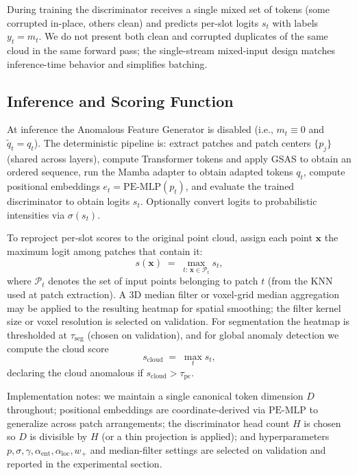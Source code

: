 During training the discriminator receives a single mixed set of tokens (some corrupted in-place, others clean) and predicts per-slot logits \(s_t\) with labels \(y_t=m_t\). We do not present both clean and corrupted duplicates of the same cloud in the same forward pass; the single-stream mixed-input design matches inference-time behavior and simplifies batching.

\subsection{Inference and Scoring Function}

At inference the Anomalous Feature Generator is disabled (i.e., \(m_t\equiv 0\) and \(\tilde{q}_t=q_t\)). The deterministic pipeline is: extract patches and patch centers \(\{p_j\}\) (shared across layers), compute Transformer tokens and apply GSAS to obtain an ordered sequence, run the Mamba adapter to obtain adapted tokens \(q_t\), compute positional embeddings \(e_t=\mathrm{PE\text{-}MLP}(p_t)\), and evaluate the trained discriminator to obtain logits \(s_t\). Optionally convert logits to probabilistic intensities via \(\sigma(s_t)\).

To reproject per-slot scores to the original point cloud, assign each point \(\mathbf{x}\) the maximum logit among patches that contain it:
\begin{equation}
s(\mathbf{x}) \;=\; \max_{t:\,\mathbf{x}\in\mathcal{P}_t} s_t,
\end{equation}
where \(\mathcal{P}_t\) denotes the set of input points belonging to patch \(t\) (from the KNN used at patch extraction). A 3D median filter or voxel-grid median aggregation may be applied to the resulting heatmap for spatial smoothing; the filter kernel size or voxel resolution is selected on validation. For segmentation the heatmap is thresholded at \(\tau_{\mathrm{seg}}\) (chosen on validation), and for global anomaly detection we compute the cloud score
\begin{equation}
s_{\mathrm{cloud}} \;=\; \max_{t} s_t,
\end{equation}
declaring the cloud anomalous if \(s_{\mathrm{cloud}}>\tau_{\mathrm{pc}}\).

Implementation notes: we maintain a single canonical token dimension \(D\) throughout; positional embeddings are coordinate-derived via \(\mathrm{PE\text{-}MLP}\) to generalize across patch arrangements; the discriminator head count \(H\) is chosen so \(D\) is divisible by \(H\) (or a thin projection is applied); and hyperparameters \(p,\sigma,\gamma,\alpha_{\mathrm{ent}},\alpha_{\mathrm{loc}},w_+\) and median-filter settings are selected on validation and reported in the experimental section.
